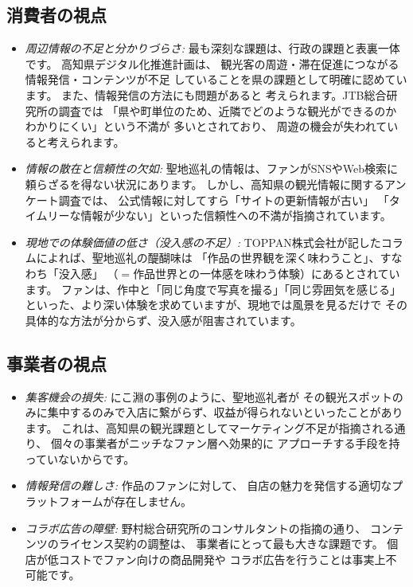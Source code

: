 \documentclass{docs}
\begin{document}
\subsection{消費者の視点}
\begin{itemize}
	\item \emph{周辺情報の不足と分かりづらさ:}
	最も深刻な課題は、行政の課題\cite{kochi_dx_plan}と表裏一体です。
	高知県デジタル化推進計画\cite{kochi_dx_plan}は、
	観光客の周遊・滞在促進につながる情報発信・コンテンツが不足
	していることを県の課題として明確に認めています。
	また、情報発信の方法にも問題があると
	考えられます。JTB総合研究所の調査\cite{jtb_trc_2017}では
	「県や町単位のため、近隣でどのような観光ができるのかわかりにくい」という不満が
	多いとされており、
	周遊の機会が失われていると考えられます。

	\item \emph{情報の散在と信頼性の欠如:}
	聖地巡礼の情報は、ファンがSNSやWeb検索に頼らざるを得ない状況にあります。
	しかし、高知県の観光情報に関するアンケート調査では、
	公式情報に対してすら「サイトの更新情報が古い」
	「タイムリーな情報が少ない」といった信頼性への不満が指摘されています\cite{kochi_tech_2017}。

	\item \emph{現地での体験価値の低さ（没入感の不足）:}
	TOPPAN株式会社が記したコラム\cite{toppan2025}によれば、聖地巡礼の醍醐味は
	「作品の世界観を深く味わうこと」、すなわち「没入感」
	（$={}$作品世界との一体感を味わう体験）にあるとされています。
	ファンは、作中と「同じ角度で写真を撮る」「同じ雰囲気を感じる」
	といった、より深い体験を求めていますが、現地では風景を見るだけで
	その具体的な方法が分からず、没入感が阻害されています。
\end{itemize}


\subsection{事業者の視点}
\begin{itemize}
\item \emph{集客機会の損失:}
	にこ淵の事例\cite{nikobuchi_mlit}のように、聖地巡礼者が
	その観光スポットのみに集中するのみで入店に繋がらず、収益が得られないといったことがあります。
	これは、高知県の観光課題としてマーケティング不足が指摘される通り\cite{kochi_tech_2017}、
	個々の事業者がニッチなファン層へ効果的に
	アプローチする手段を持っていないからです。

	\item \emph{情報発信の難しさ:}
	作品のファンに対して、
	自店の魅力を発信する適切なプラットフォームが存在しません。

	\item \emph{コラボ広告の障壁:}
	野村総合研究所のコンサルタントの指摘\cite{nri2024}の通り、
	コンテンツのライセンス契約の調整は、
	事業者にとって最も大きな課題です。
	個店が低コストでファン向けの商品開発や
	コラボ広告を行うことは事実上不可能です。
\end{itemize}
\end{document}
